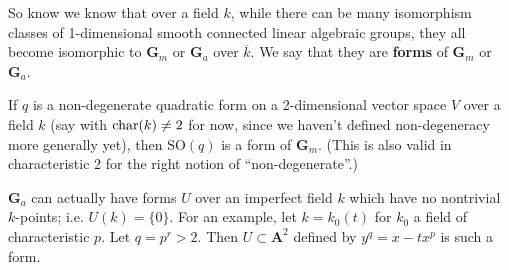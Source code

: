 \documentclass[10pt]{article}
\renewcommand{\AA}{\mathbf{A}}
\renewcommand{\(}{\left(}
\renewcommand{\)}{\right)}
\renewcommand{\bar}{\overline}
\newcommand{\SO}{\mathrm{SO}}
\numberwithin{thm}{subsection}
\begin{document}
So know we know that over a field $k$,
while there can be many isomorphism classes of 1-dimensional
smooth connected linear algebraic groups, they all become isomorphic to $\mathbf{G}_m$ or $\mathbf{G}_a$ over $\bar k$.
We say that they are \textbf{forms} of $\mathbf{G}_m$ or $\mathbf{G}_a$.
\begin{ex}If $q$ is a non-degenerate quadratic form on a 2-dimensional vector space $V$ over a field $k$
(say with ${\rm{char}}(k) \ne 2$ for now, since we haven't defined non-degeneracy
more generally yet), then $\SO(q)$ is a form of $\mathbf{G}_m$. (This is also valid
in characteristic 2 for the right notion of ``non-degenerate''.)
\end{ex}
\begin{ex}$\mathbf{G}_a$ can actually have forms $U$ over an imperfect field $k$
which have no nontrivial $k$-points; i.e. $U(k)=\{0\}$.
For an example, let $k=k_0(t)$ for $k_0$ a field of characteristic $p$.
Let $q=p^r>2$. Then $U\subset \AA^2$ defined by $y^q=x-tx^p$ is such a form.
\end{ex}
\end{document}
